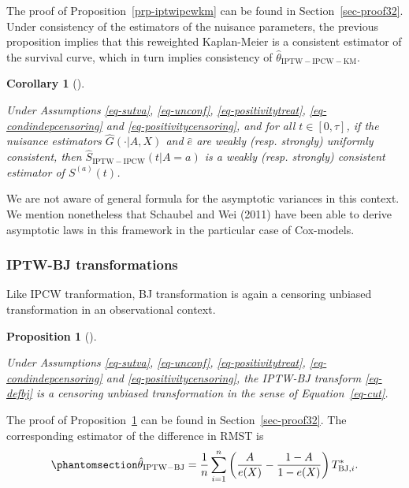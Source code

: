 \documentclass[
  11pt,
  a4paper,
]{article}
\theoremstyle{plain}
\theoremstyle{plain}
\newtheorem{corollary}{Corollary}[section]
\theoremstyle{plain}
\newtheorem{proposition}{Proposition}[section]
\theoremstyle{definition}
\theoremstyle{remark}
\begin{document}
The proof of Proposition~\ref{prp-iptwipcwkm} can be found in
Section~\ref{sec-proof32}. Under consistency of the estimators of the
nuisance parameters, the previous proposition implies that this
reweighted Kaplan-Meier is a consistent estimator of the survival curve,
which in turn implies consistency of
\(\widehat{\theta}_{\mathrm{IPTW-IPCW-KM}}\).

\begin{corollary}[]\protect\hypertarget{cor-consiptwipcwkm}{}\label{cor-consiptwipcwkm}

Under Assumptions
\ref{eq-sutva}, \ref{eq-unconf}, \ref{eq-positivitytreat}, \ref{eq-condindepcensoring}
and \ref{eq-positivitycensoring}, and for all \(t \in [0,\tau]\), if the
nuisance estimators \(\widehat G(\cdot|A,X)\) and \(\widehat e\) are
weakly (resp. strongly) uniformly consistent, then
\(\widehat{S}_{\mathrm{IPTW-IPCW}}(t | A=a)\) is a weakly (resp.
strongly) consistent estimator of \(S^{(a)}(t)\).

\end{corollary}

We are not aware of general formula for the asymptotic variances in this
context. We mention nonetheless that Schaubel and Wei (2011) have been
able to derive asymptotic laws in this framework in the particular case
of Cox-models.

\subsubsection{IPTW-BJ transformations}\label{iptw-bj-transformations}

Like IPCW tranformation, BJ transformation is again a censoring unbiased
transformation in an observational context.

\begin{proposition}[]\protect\hypertarget{prp-iptwbj}{}\label{prp-iptwbj}

Under Assumptions
\ref{eq-sutva}, \ref{eq-unconf}, \ref{eq-positivitytreat}, \ref{eq-condindepcensoring}
and \ref{eq-positivitycensoring}, the IPTW-BJ transform \ref{eq-defbj}
is a censoring unbiased transformation in the sense of
Equation~\ref{eq-cut}.

\end{proposition}

The proof of Proposition~\ref{prp-iptwbj} can be found in
Section~\ref{sec-proof32}. The corresponding estimator of the difference
in RMST is \begin{equation}\phantomsection\label{eq-iptwbj}{
\hat \theta_{\mathrm{IPTW-BJ}} = \frac1n\sum_{i=1}^n  \left(\frac{A}{e(X)}-\frac{1-A}{1-e(X)} \right) T^*_{\mathrm{BJ},i}.
}\end{equation}
\end{document}
